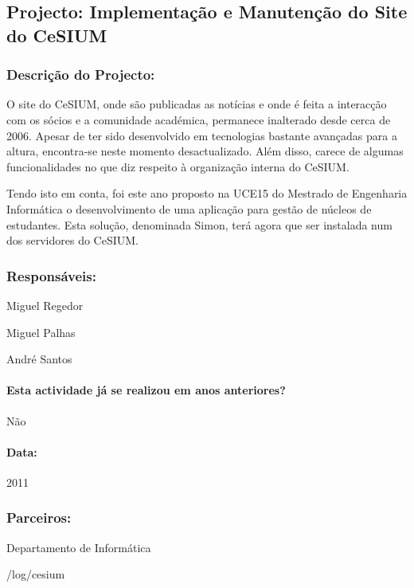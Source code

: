 \subsection{Projecto: Implementação e Manutenção do Site do CeSIUM} %

\subsubsection*{Descrição do Projecto:}
O site do CeSIUM, onde são publicadas as notícias e onde é feita a interacção com os sócios e a comunidade académica, permanece inalterado desde cerca de 2006. Apesar de ter sido desenvolvido em tecnologias bastante avançadas para a altura, encontra-se neste momento desactualizado. Além disso, carece de algumas funcionalidades no que diz respeito à organização interna do CeSIUM.

Tendo isto em conta, foi este ano proposto na UCE15 do Mestrado de Engenharia Informática o desenvolvimento de uma aplicação para gestão de núcleos de estudantes. Esta solução, denominada Simon, terá agora que ser instalada num dos servidores do CeSIUM.

\subsubsection*{Responsáveis:}
\begin{itemizedash}
	\item{Miguel Regedor}
	\item{Miguel Palhas}
	\item{André Santos}
\end{itemizedash}

\paragraph{Esta actividade já se realizou em anos anteriores?}
Não


\paragraph{Data:} 2011

\subsubsection*{Parceiros:}
\begin{itemizedash}
    \item{Departamento de Informática}
	\item{/log/cesium}
\end{itemizedash}

